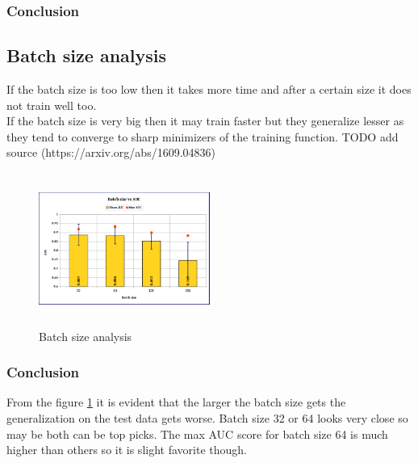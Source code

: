 \subsubsection{Conclusion}



\subsection{Batch size analysis}
If the batch size is too low then it takes more time and after a certain size it does not train well too.\\
If the batch size is very big then it may train faster but they generalize lesser as they tend to converge to sharp minimizers of the training function.
TODO add source (https://arxiv.org/abs/1609.04836) 
\begin{figure}[h]
\centering
\includegraphics[height=5cm,width=0.5\textwidth]{images/densenet/batch_size}
\caption{Batch size analysis}
\label{fig:batch_size}
\end{figure}

\subsubsection{Conclusion}
From the figure \ref{fig:batch_size} it is evident that the larger the batch size gets the generalization on the test data gets worse. Batch size 32 or 64 looks very close so may be both can be top picks.
The max AUC score for batch size 64 is much higher than others so it is slight favorite though. 


